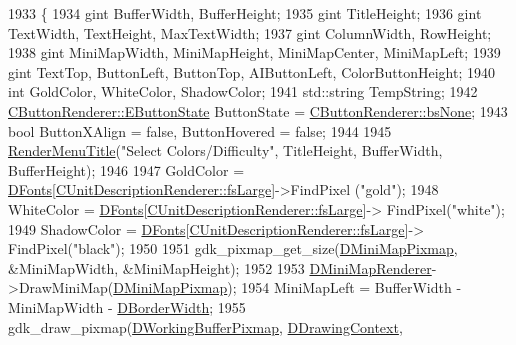 \begin{DoxyCode}
1933                                                \{
1934     gint BufferWidth, BufferHeight;
1935     gint TitleHeight;
1936     gint TextWidth, TextHeight, MaxTextWidth;
1937     gint ColumnWidth, RowHeight;
1938     gint MiniMapWidth, MiniMapHeight, MiniMapCenter, MiniMapLeft;
1939     gint TextTop, ButtonLeft, ButtonTop, AIButtonLeft, ColorButtonHeight;
1940     \textcolor{keywordtype}{int} GoldColor, WhiteColor, ShadowColor;
1941     std::string TempString;
1942     \hyperlink{classCButtonRenderer_ae0eccda184600f6e14bfd59033e5e9a1}{CButtonRenderer::EButtonState} ButtonState = 
      \hyperlink{classCButtonRenderer_ae0eccda184600f6e14bfd59033e5e9a1aa0cd7277705307bef6c50f2250b5d62d}{CButtonRenderer::bsNone};
1943     \textcolor{keywordtype}{bool} ButtonXAlign = \textcolor{keyword}{false}, ButtonHovered = \textcolor{keyword}{false};
1944     
1945     \hyperlink{classCApplicationData_a548c5924a281c7e226fd7cac44e59920}{RenderMenuTitle}(\textcolor{stringliteral}{"Select Colors/Difficulty"}, TitleHeight, BufferWidth, BufferHeight); 
1946     
1947     GoldColor = \hyperlink{classCApplicationData_afde9247d0a3ea87393ec86dcdb1e8274}{DFonts}[\hyperlink{classCUnitDescriptionRenderer_a3ea4cd83b6dd9533ab3abb953a7da35aaf467097fe4f4811a5e2f1959c86e071d}{CUnitDescriptionRenderer::fsLarge}]->FindPixel
      (\textcolor{stringliteral}{"gold"});
1948     WhiteColor = \hyperlink{classCApplicationData_afde9247d0a3ea87393ec86dcdb1e8274}{DFonts}[\hyperlink{classCUnitDescriptionRenderer_a3ea4cd83b6dd9533ab3abb953a7da35aaf467097fe4f4811a5e2f1959c86e071d}{CUnitDescriptionRenderer::fsLarge}]->
      FindPixel(\textcolor{stringliteral}{"white"});
1949     ShadowColor = \hyperlink{classCApplicationData_afde9247d0a3ea87393ec86dcdb1e8274}{DFonts}[\hyperlink{classCUnitDescriptionRenderer_a3ea4cd83b6dd9533ab3abb953a7da35aaf467097fe4f4811a5e2f1959c86e071d}{CUnitDescriptionRenderer::fsLarge}]->
      FindPixel(\textcolor{stringliteral}{"black"});
1950     
1951     gdk\_pixmap\_get\_size(\hyperlink{classCApplicationData_abe3af81659ead5113b7b2f165a88e737}{DMiniMapPixmap}, &MiniMapWidth, &MiniMapHeight); 
1952     
1953     \hyperlink{classCApplicationData_a59b0f5dfe30ed5a54dd28aee98109e34}{DMiniMapRenderer}->DrawMiniMap(\hyperlink{classCApplicationData_abe3af81659ead5113b7b2f165a88e737}{DMiniMapPixmap});
1954     MiniMapLeft = BufferWidth - MiniMapWidth - \hyperlink{classCApplicationData_a566b69c72fa982c6ecf8e47dc21df489}{DBorderWidth};
1955     gdk\_draw\_pixmap(\hyperlink{classCApplicationData_afa34cf2780f38dd28c0c811e69d60a97}{DWorkingBufferPixmap}, \hyperlink{classCApplicationData_aa6c5bea9bdcc64398e5a3f693661d37c}{DDrawingContext}, 

\end{DoxyCode}
